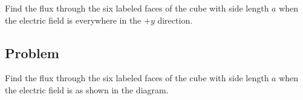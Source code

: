 \documentclass{article}
\begin{document}


Find the flux through the six labeled faces of the cube with side length $a$ when the electric field is everywhere in the $+y$ direction.

\vskip 120.44999999999999pt

\subsection{Problem}



Find the flux through the six labeled faces of the cube with side length $a$ when the electric field is as shown in the diagram.
\end{document}
